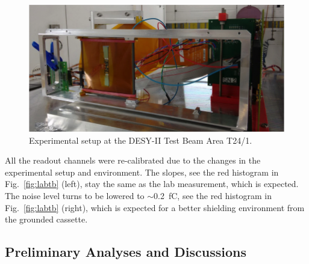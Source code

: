 \documentclass[conference]{IEEEtran}
\begin{document}
\begin{figure}[!ht]%
  \centering
  \includegraphics[width=1.0\linewidth]{pics/tb_2.png}
  \caption{Experimental setup at the DESY-II Test Beam Area T24/1.}%
\label{fig:tb2}%
\end{figure}

All the readout channels were re-calibrated due to the changes in the experimental setup and environment.
The slopes, see the red histogram in Fig.~\ref{fig:labtb} (left), stay the same as the lab measurement, which is expected.
The noise level turns to be lowered to $\sim$\SI{0.2}{fC}, see the red histogram in Fig.~\ref{fig:labtb} (right),
which is expected for a better shielding environment from the grounded cassette.

\subsection*{Preliminary Analyses and Discussions}
\end{document}
